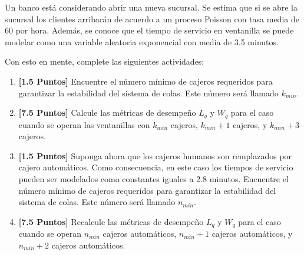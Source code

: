 \documentclass[ a4paper, twoside, 11pt]{article}
\begin{document}
\begin{problem}
Un banco est\'a considerando abrir una nueva sucursal. Se estima que si se abre la sucursal los clientes arribar\'an de acuerdo a un proceso Poisson con tasa media de 60 por hora. Adem\'as, se conoce que el tiempo de servicio en ventanilla se puede modelar como una variable aleatoria exponencial con media de 3.5 minutos. 

Con esto en mente, complete las siguientes actividades: 
\begin{enumerate}[label=\textbf{\alph*)}]
\item \textbf{[1.5 Puntos]} Encuentre el n\'umero m\'inimo de cajeros requeridos para garantizar la estabilidad del sistema de colas. Este n\'umero ser\'a llamado $k_{min}$. 
\item \textbf{[7.5 Puntos]} Calcule las m\'etricas de desempe\~no $L_q$ y $W_q$ para el caso cuando se operan las ventanillas con $k_{min}$ cajeros, $k_{min} + 1$ cajeros, y $k_{min} + 3$ cajeros. 
\item \textbf{[1.5 Puntos]} Suponga ahora que los cajeros humanos son remplazados por cajero autom\'aticos. Como consecuencia, en este caso los tiempos de servicio pueden ser modelados como constantes iguales a 2.8 minutos. Encuentre el n\'umero m\'inimo de cajeros requeridos para garantizar la estabilidad del sistema de colas. Este n\'umero ser\'a llamado $n_{min}$. 
\item \textbf{[7.5 Puntos]} Recalcule las m\'etricas de desempe\~no $L_q$ y $W_q$ para el caso cuando se operan $n_{min}$ cajeros autom\'aticos, $n_{min} + 1$ cajeros autom\'aticos, y $n_{min} + 2$ cajeros autom\'aticos. 
\end{enumerate}


\end{problem}
\end{document}
